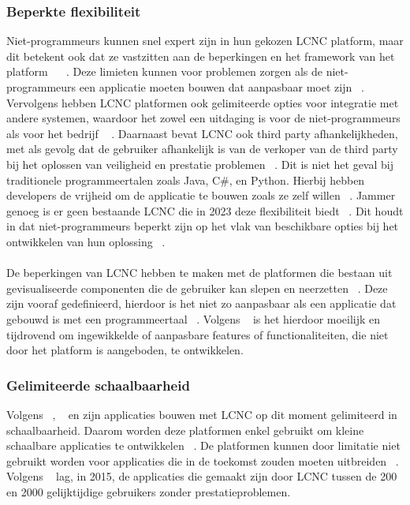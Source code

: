 \subsubsection{Beperkte flexibiliteit}
\label{subsec:beperkte-flexibiliteit}
Niet-programmeurs kunnen snel expert zijn in hun gekozen LCNC platform, maar dit betekent ook dat ze vastzitten aan de beperkingen en het framework van het platform 
~\autocite{Sufi_2023} ~\autocite{Talesra_2021}. 
Deze limieten kunnen voor problemen zorgen als de niet-programmeurs een applicatie moeten bouwen dat aanpasbaar moet zijn ~\autocite{Talesra_2021}. 
Vervolgens hebben LCNC platformen ook gelimiteerde opties voor integratie met andere systemen, waardoor het zowel een uitdaging is voor de niet-programmeurs als 
voor het bedrijf ~\autocite{Talesra_2021} \autocite{Oluwaseyi2024}. Daarnaast bevat LCNC ook third party afhankelijkheden, met als gevolg dat de gebruiker afhankelijk is van de verkoper van de 
third party bij het oplossen van veiligheid en prestatie problemen ~\autocite{Talesra_2021}. Dit is niet het geval bij traditionele programmeertalen zoals Java, C\#, en Python. 
Hierbij hebben developers de vrijheid om de applicatie te bouwen zoals ze zelf willen ~\autocite{Sufi_2023}. Jammer genoeg is er geen bestaande LCNC die in 2023 deze 
flexibiliteit biedt ~\autocite{Sufi_2023}. Dit houdt in dat niet-programmeurs beperkt zijn op het vlak van beschikbare opties bij het ontwikkelen van hun oplossing ~\autocite{Sufi_2023}. 
\\
\\
De beperkingen van LCNC hebben te maken met de platformen die bestaan uit gevisualiseerde componenten die de gebruiker kan slepen en
 neerzetten ~\autocite{Yan2021}. Deze zijn vooraf gedefinieerd, hierdoor is het niet zo aanpasbaar als een applicatie 
 dat gebouwd is met een programmeertaal ~\autocite{Yan2021}. Volgens ~\textcite{Yan2021} 
is het hierdoor moeilijk en tijdrovend om ingewikkelde of aanpasbare features of functionaliteiten, die niet door het platform is aangeboden, te ontwikkelen.
\subsubsection*{Gelimiteerde schaalbaarheid}
\label{subsec:gelimiteerde-schaalbaarheid}
Volgens ~\textcite{Elshan2023}, ~\textcite{Sufi_2023} en \textcite{Khankhoje_2022} zijn applicaties bouwen met LCNC op dit moment gelimiteerd in schaalbaarheid. Daarom worden deze platformen enkel gebruikt om kleine schaalbare applicaties te ontwikkelen ~\autocite{Sufi_2023}. 
De platformen kunnen door limitatie niet gebruikt worden voor applicaties die in de toekomst zouden moeten uitbreiden ~\autocite{Elshan2023}. 
Volgens ~\textcite{Yan2021} lag, in 2015, de applicaties die gemaakt zijn door LCNC tussen de 200 en 2000 gelijktijdige gebruikers zonder prestatieproblemen.

